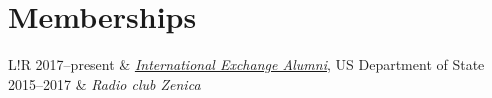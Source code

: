 \documentclass[10pt, a4paper]{article}
\newcommand\VRule{\color{lightgray}\vrule width 0.5pt}
\begin{document}
	\section*{\color{main} Memberships}
	\begin{tabular}{L!{\VRule}R}
        2017--present & \href{https://alumni.state.gov/}{\textit{International
        Exchange Alumni}}, US Department of State \\[5pt]
		2015--2017 & \textit{Radio club Zenica} %
	\end{tabular}

	
\end{document}
